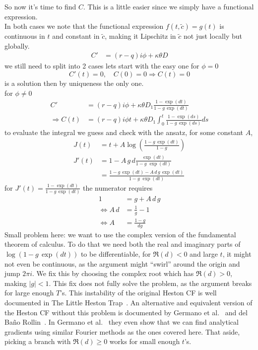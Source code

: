So now it's time to find $C$.
This is a little easier since we simply have a functional expression.\\
In both cases we note that the functional expression $f(t,\tilde{c})=g(t)$ is continuous in $t$ and constant in $\tilde{c}$, making it Lipschitz in $\tilde{c}$ not just locally but globally.
\begin{align}
C' &=(r-q) i \phi+\kappa\theta D
\end{align}
we still need to split into 2 cases lets start with the easy one
for $\phi=0$
\begin{equation}C'(t)=0,\quad C(0)=0\Rightarrow C(t)=0\end{equation}
is a solution then by uniqueness the only one.\\
for $\phi\neq 0$
\begin{align}
C' &=(r-q) i \phi+\kappa\theta D_1 \frac{1-\exp(dt)}{1-g\, \exp(dt)}\\
\Rightarrow C(t)&=(r-q)i\phi t +\kappa \theta D_1\int_0^t{\frac{1-\exp(ds)}{1-g\, \exp(ds)}ds}
\end{align}
to evaluate the integral we guess and check with the ansatz, for some constant $A$,
\begin{align}
J(t)&=t+A\log\!\left(\frac{1-g\,\exp(dt)}{1-g}\right)\\
J'(t)&=1-A \, g \, d \frac{\exp(dt)}{1-g\,\, \exp(dt)}\\
&=\frac{1-g\,\exp(dt)-A\, d\, g\,\exp(dt)}{1-g\,\, \exp(dt)}
\end{align}
for $J'(t)=\frac{1-\exp(dt)}{1-g\,\exp(dt)}$ the numerator requires
\begin{align}
    1&=g+A\, d\, g\\
    \Leftrightarrow A\, d&=\frac{1}{g}-1\\
    \Leftrightarrow A&=\frac{1-g}{dg}
\end{align}
Small problem here: we want to use the complex version of the fundamental theorem of calculus.
To do that we need both the real and imaginary parts of $\log(1 - g\,\exp(dt))$ to be differentiable, for $\Re(d)<0$ and large $t$, it might not even be continuous,
as the argument might ``swirl'' around the origin and jump $2\pi i$. We fix this by choosing the complex root which has $\Re(d)> 0$, making $|g|<1$.
This fix does not fully solve the problem, as the argument breaks for large enough $T$'s. This instability of the original Heston CF is well
documented in The Little Heston Trap~\cite{albrecher2007}. An alternative and equivalent version of the Heston CF without this problem is documented by Germano et al.~\cite{germano2017} and del Ba\~{n}o Rollin~\cite{delBanoRollin2010}.
In Germano et al.~\cite{germano2017} they even show that we can find analytical gradients using similar Fourier methods as the ones covered here. That aside, picking a branch with $\Re(d)\geq 0$ works for small enough $t$'s.



